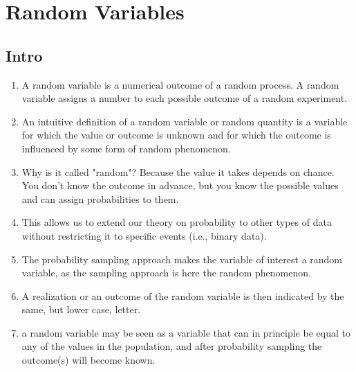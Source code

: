\chapter{Random Variables}

\section{Intro}


\begin{enumerate}
    \item A random variable is a numerical outcome of a random process.
    A random variable assigns a number to each possible outcome of a random experiment.
    \hfill \cite{common/online/chatgpt}

    \item An intuitive definition of a random variable or random quantity is a variable for which the value or outcome is unknown and for which the outcome is influenced by some form of random phenomenon. 
    \hfill \cite{statistics/book/Statistics-for-Data-Scientists/Maurits-Kaptein}

    \item Why is it called "random"? 
    Because the value it takes depends on chance.
    You don’t know the outcome in advance, but you know the possible values and can assign probabilities to them.
    \hfill \cite{common/online/chatgpt}

    \item This allows us to extend our theory on probability to other types of data without restricting it to specific events (i.e., binary data).
    \hfill \cite{statistics/book/Statistics-for-Data-Scientists/Maurits-Kaptein}

    \item The probability sampling approach makes the variable of interest a random variable, as the sampling approach is here the random phenomenon.
    \hfill \cite{statistics/book/Statistics-for-Data-Scientists/Maurits-Kaptein}

    \item A realization or an outcome of the random variable is then indicated by the same, but lower case, letter.
    \hfill \cite{statistics/book/Statistics-for-Data-Scientists/Maurits-Kaptein}

    \item a random variable may be seen as a variable that can in principle be equal to any of the values in the population, and after probability sampling the outcome(s) will become known. 
    \hfill \cite{statistics/book/Statistics-for-Data-Scientists/Maurits-Kaptein}


\end{enumerate}
